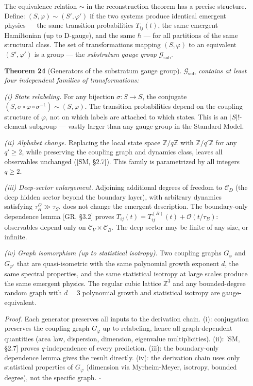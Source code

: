 \documentclass[
]{article}
\begin{document}
The equivalence relation \(\sim\) in the reconstruction theorem has a
precise structure. Define: \((S, \varphi) \sim (S', \varphi')\) if the
two systems produce identical emergent physics --- the same transition
probabilities \(T_{ij}(t)\), the same emergent Hamiltonian (up to
D-gauge), and the same \(\hbar\) --- for all partitions of the same
structural class. The set of transformations mapping \((S, \varphi)\) to
an equivalent \((S', \varphi')\) is a group --- the \emph{substratum
gauge group} \(\mathcal{G}_{\text{sub}}\).

\textbf{Theorem 24} (Generators of the substratum gauge group).
\emph{\(\mathcal{G}_{\text{sub}}\) contains at least four independent
families of transformations:}

\emph{(i) State relabeling.} For any bijection \(\sigma: S \to S\), the
conjugate
\((S, \sigma \circ \varphi \circ \sigma^{-1}) \sim (S, \varphi)\). The
transition probabilities depend on the coupling structure of
\(\varphi\), not on which labels are attached to which states. This is
an \(|S|!\)-element subgroup --- vastly larger than any gauge group in
the Standard Model.

\emph{(ii) Alphabet change.} Replacing the local state space
\(\mathbb{Z}/q\mathbb{Z}\) with \(\mathbb{Z}/q'\mathbb{Z}\) for any
\(q' \geq 2\), while preserving the coupling graph and dynamics class,
leaves all observables unchanged ({[}SM, §2.7{]}). This family is
parametrized by all integers \(q \geq 2\).

\emph{(iii) Deep-sector enlargement.} Adjoining additional degrees of
freedom to \(\mathcal{C}_D\) (the deep hidden sector beyond the boundary
layer), with arbitrary dynamics satisfying \(\tau_B^D \gg \tau_S\), does
not change the emergent description. The boundary-only dependence lemma
{[}GR, §3.2{]} proves
\(T_{ij}(t) = T_{ij}^{(B)}(t) + \mathcal{O}(t/\tau_B)\): observables
depend only on \(\mathcal{C}_V \times \mathcal{C}_B\). The deep sector
may be finite of any size, or infinite.

\emph{(iv) Graph isomorphism (up to statistical isotropy).} Two coupling
graphs \(G_\varphi\) and \(G_{\varphi'}\) that are quasi-isometric with
the same polynomial growth exponent \(d\), the same spectral properties,
and the same statistical isotropy at large scales produce the same
emergent physics. The regular cubic lattice \(\mathbb{Z}^3\) and any
bounded-degree random graph with \(d = 3\) polynomial growth and
statistical isotropy are gauge-equivalent.

\emph{Proof.} Each generator preserves all inputs to the derivation
chain. (i): conjugation preserves the coupling graph \(G_\varphi\) up to
relabeling, hence all graph-dependent quantities (area law, dispersion,
dimension, eigenvalue multiplicities). (ii): {[}SM, §2.7{]} proves
\(q\)-independence of every prediction. (iii): the boundary-only
dependence lemma gives the result directly. (iv): the derivation chain
uses only statistical properties of \(G_\varphi\) (dimension via
Myrheim-Meyer, isotropy, bounded degree), not the specific graph.
\(\square\)
\end{document}
